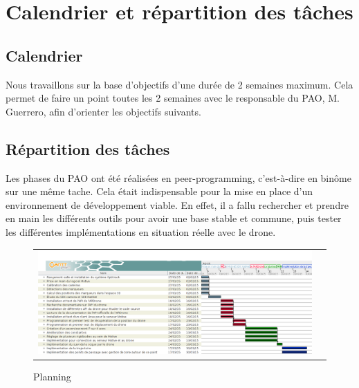 \chapter{Calendrier et répartition des tâches}

\section{Calendrier}

	Nous travaillons sur la base d'objectifs d'une durée de 2 semaines maximum. Cela permet de faire un point toutes les 2 semaines avec le responsable du PAO, M. Guerrero, afin d'orienter les objectifs suivants.

\section{Répartition des tâches}
	Les phases du PAO ont été réalisées en peer-programming, c'est-à-dire en binôme sur une même tache. Cela était indispensable pour la mise en place d'un environnement de développement viable. En effet, il a fallu rechercher et prendre en main les différents outils pour avoir une base stable et commune, puis tester les différentes implémentations en situation réelle avec le drone.

	\begin{figure}
	\hspace{-1cm}
	\begin{tabular}{|@{}l@{}l}
		\includegraphics[width=24cm,angle=90]{images/calendrier.png}
	 \end{tabular}
	 \caption{Planning}
	 \end{figure}
